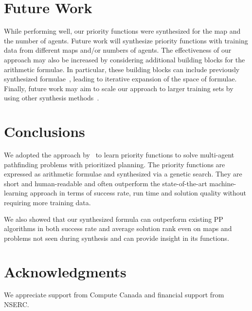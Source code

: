 \documentclass[letterpaper]{article}
\begin{document}
\section{Future Work}

While performing well, our priority functions were synthesized for the map and the number of agents. Future work will synthesize priority functions with training data from different maps and/or numbers of agents. The effectiveness of our approach may also be increased by considering additional building blocks for the arithmetic formulae. In particular, these building blocks can include previously synthesized formulae~\cite{bulitko2022portability}, leading to iterative expansion of the space of formulae. Finally, future work may aim to scale our approach to larger training sets by using other synthesis methods~\citep{shah2022near,mapElites,Gallotta_2022,FI2Pop}.

\section{Conclusions}
\label{sec:conclusions}

We adopted the approach by~\citet{bulitko2022portability} to learn priority functions to solve multi-agent pathfinding problems with prioritized planning. The priority functions are expressed as arithmetic formulae and synthesized via a genetic search. They are short and human-readable and often outperform the state-of-the-art machine-learning approach in terms of success rate, run time and solution quality without requiring more training data.

We also showed that our synthesized formula can outperform existing PP algorithms in both success rate and average solution rank even on maps and problems not seen during synthesis and can provide insight in its functions.

\section*{Acknowledgments}

We appreciate support from Compute Canada and financial support from NSERC.
\end{document}
